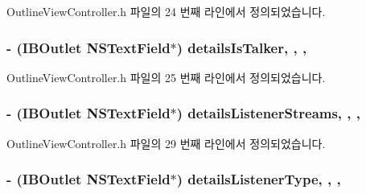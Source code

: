 Outline\+View\+Controller.\+h 파일의 24 번째 라인에서 정의되었습니다.

\subsubsection[{\texorpdfstring{details\+Is\+Talker}{detailsIsTalker}}]{\setlength{\rightskip}{0pt plus 5cm}-\/ (I\+B\+Outlet N\+S\+Text\+Field$\ast$) details\+Is\+Talker\hspace{0.3cm}{\ttfamily [read]}, {\ttfamily [write]}, {\ttfamily [atomic]}, {\ttfamily [weak]}}\hypertarget{interface_outline_view_controller_a65c0b4ab07c845325e04a290e594d26f}{}\label{interface_outline_view_controller_a65c0b4ab07c845325e04a290e594d26f}


Outline\+View\+Controller.\+h 파일의 25 번째 라인에서 정의되었습니다.

\subsubsection[{\texorpdfstring{details\+Listener\+Streams}{detailsListenerStreams}}]{\setlength{\rightskip}{0pt plus 5cm}-\/ (I\+B\+Outlet N\+S\+Text\+Field$\ast$) details\+Listener\+Streams\hspace{0.3cm}{\ttfamily [read]}, {\ttfamily [write]}, {\ttfamily [atomic]}, {\ttfamily [weak]}}\hypertarget{interface_outline_view_controller_ab8bcb90be6d07db7886e0e1234d76c98}{}\label{interface_outline_view_controller_ab8bcb90be6d07db7886e0e1234d76c98}


Outline\+View\+Controller.\+h 파일의 29 번째 라인에서 정의되었습니다.

\subsubsection[{\texorpdfstring{details\+Listener\+Type}{detailsListenerType}}]{\setlength{\rightskip}{0pt plus 5cm}-\/ (I\+B\+Outlet N\+S\+Text\+Field$\ast$) details\+Listener\+Type\hspace{0.3cm}{\ttfamily [read]}, {\ttfamily [write]}, {\ttfamily [atomic]}, {\ttfamily [weak]}}\hypertarget{interface_outline_view_controller_a003d3d3cc242b2edc4281a236cf6f2ea}{}\label{interface_outline_view_controller_a003d3d3cc242b2edc4281a236cf6f2ea}


